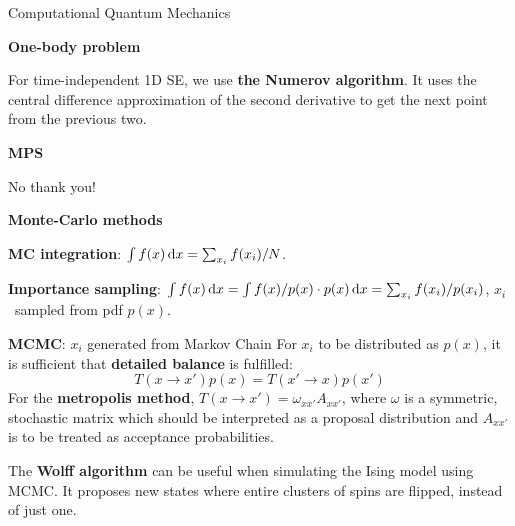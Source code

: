 \documentclass[10pt,landscape]{article}
\newcommand{\topiccolor}{green}
\newcommand{\topic}[2]{%
	\renewcommand{\topiccolor}{#1}
	\begin{tcolorbox}[boxsep=0.5mm, left=1mm, right=1mm, top=0mm, bottom=0mm,
		colback=#1!30, colframe=#1, arc is angular]%
		\centering \textbf{#2}%
	\end{tcolorbox}%
}
\newcommand{\cbf}[1]{\textcolor{\topiccolor!70!black}{\textbf{#1}}}
\begin{document}
\begin{multicols*}{3}
\begin{tcolorbox}[colframe=black, colback=white]
	\centering \large Computational Quantum Mechanics
\end{tcolorbox}

\topic{blue}{One-body problem}

For time-independent 1D SE, we use \cbf{the Numerov algorithm}.
It uses the central difference approximation of the second derivative
to get the next point from the previous two.

\topic{cyan}{MPS}

No thank you!

\topic{red}{Monte-Carlo methods}

\cbf{MC integration}:
$\int f(x) \dl x = \sum_{x_i} f(x_i)/N$.

\cbf{Importance sampling}:
$\int f(x) \dl x = \int f(x)/p(x) \cdot p(x) \dl x = \sum_{x_i} f(x_i) / p(x_i)$,
$x_i$ sampled from pdf $p(x)$.

\cbf{MCMC}: $x_i$ generated from Markov Chain
For $x_i$ to be distributed as $p(x)$, it is sufficient that
\cbf{detailed balance} is fulfilled:
\[
	T(x \to x') p(x) = T(x' \to x) p(x')
\]
For the \cbf{metropolis method}, $T(x \to x') = \omega_{xx'}A_{x x'}$,
where $\omega$ is a symmetric, stochastic matrix which should
be interpreted as a proposal distribution and $A_{x x'}$ is
to be treated as acceptance probabilities.

The \cbf{Wolff algorithm} can be useful when simulating the Ising model
using MCMC.
It proposes new states where entire clusters of spins are flipped,
instead of just one.


\end{multicols*}
\end{document}

